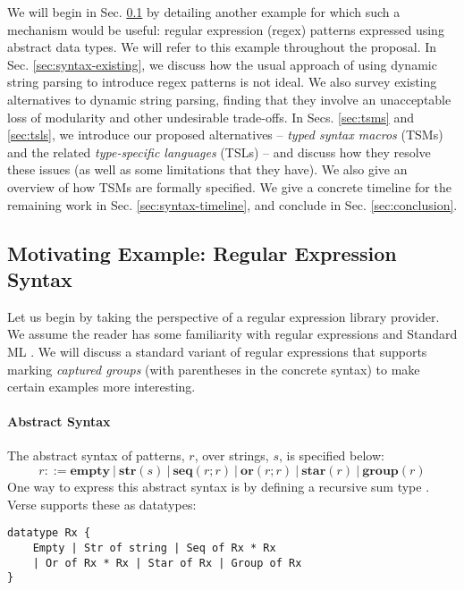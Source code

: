 We will begin in Sec. \ref{sec:examples} by detailing another example for which such a mechanism would be useful: regular expression (regex) patterns expressed using abstract data types. We will refer to this example throughout the proposal. In Sec. \ref{sec:syntax-existing}, we discuss how the usual approach of using dynamic string parsing to introduce regex patterns is not ideal. We also survey existing alternatives to dynamic string parsing, finding that they involve an unacceptable loss of modularity and other undesirable trade-offs. In Secs. \ref{sec:tsms} and \ref{sec:tsls}, we introduce our proposed alternatives -- \emph{typed syntax macros} (TSMs) and the related \emph{type-specific languages} (TSLs) -- and discuss how they resolve these issues (as well as some limitations that they have). We  also give an overview of how TSMs are formally specified. We give a concrete timeline for the remaining work in Sec. \ref{sec:syntax-timeline}, and conclude in Sec. \ref{sec:conclusion}.


\subsection{Motivating Example: Regular Expression Syntax}\label{sec:examples}\label{sec:syntax-examples}
Let us begin by taking the perspective of a regular expression library provider. We assume the reader has some familiarity with regular expressions \cite{Thompson:1968:PTR:363347.363387} and Standard ML \cite{harper1997programming}. We will discuss a standard variant of regular expressions that supports marking \emph{captured groups} (with parentheses in the concrete syntax) to make certain examples more interesting.

\paragraph{Abstract Syntax} The abstract syntax of {patterns}, $r$, over strings, $s$, is specified below:\[r ::= \textbf{empty} ~|~ \textbf{str}(s) ~|~ \textbf{seq}(r; r) ~|~ \textbf{or}(r; r) ~|~ \textbf{star}(r) ~|~ \textbf{group}(r)\]
One way to express this abstract syntax is by defining a recursive sum type \cite{pfpl}. Verse supports these as datatypes:

\begin{lstlisting}[numbers=none]
datatype Rx {
    Empty | Str of string | Seq of Rx * Rx 
    | Or of Rx * Rx | Star of Rx | Group of Rx
}
\end{lstlisting}

